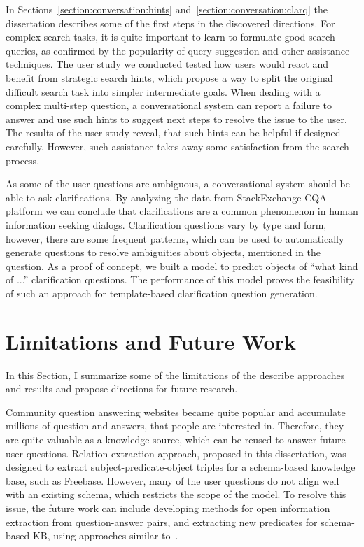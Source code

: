 In Sections~\ref{section:conversation:hints} and~\ref{section:conversation:clarq} the dissertation describes some of the first steps in the discovered directions.
For complex search tasks, it is quite important to learn to formulate good search queries, as confirmed by the popularity of query suggestion and other assistance techniques.
The user study we conducted tested how users would react and benefit from strategic search hints, which propose a way to split the original difficult search task into simpler intermediate goals.
When dealing with a complex multi-step question, a conversational system can report a failure to answer and use such hints to suggest next steps to resolve the issue to the user.
The results of the user study reveal, that such hints can be helpful if designed carefully.
However, such assistance takes away some satisfaction from the search process.

As some of the user questions are ambiguous, a conversational system should be able to ask clarifications.
By analyzing the data from StackExchange CQA platform we can conclude that clarifications are a common phenomenon in human information seeking dialogs.
Clarification questions vary by type and form, however, there are some frequent patterns, which can be used to automatically generate questions to resolve ambiguities about objects, mentioned in the question.
As a proof of concept, we built a model to predict objects of ``what kind of ...'' clarification questions.
The performance of this model proves the feasibility of such an approach for template-based clarification question generation.

\section{Limitations and Future Work}
\label{section:conclusion:future_work}

In this Section, I summarize some of the limitations of the describe approaches and results and propose directions for future research.

Community question answering websites became quite popular and accumulate millions of question and answers, that people are interested in.
Therefore, they are quite valuable as a knowledge source, which can be reused to answer future user questions.
Relation extraction approach, proposed in this dissertation, was designed to extract subject-predicate-object triples for a schema-based knowledge base, such as Freebase.
However, many of the user questions do not align well with an existing schema, which restricts the scope of the model.
To resolve this issue, the future work can include developing methods for open information extraction from question-answer pairs, and extracting new predicates for schema-based KB, \eg using approaches similar to~\cite{Gupta:2014:BOS:2732286.2732288}.


